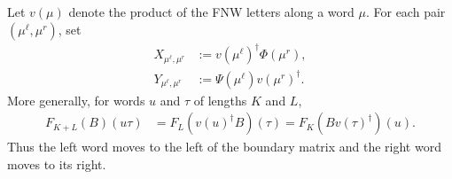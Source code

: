 \begin{definition}
    \label{def:fnw_middle_boundary_matrices}
    \leanok
    Let $v(\mu)$ denote the product of the FNW letters along a word $\mu$.
    For each pair $(\mu^\ell,\mu^r)$, set
    \begin{align}
        X_{\mu^\ell,\mu^r}
         & :=v(\mu^\ell)^\dagger\Phi(\mu^r),
        \label{eq:fnw_left_middle_boundary}  \\
        Y_{\mu^\ell,\mu^r}
         & :=\Psi(\mu^\ell)v(\mu^r)^\dagger.
        \label{eq:fnw_right_middle_boundary}
    \end{align}
    More generally, for words $u$ and $\tau$ of lengths $K$ and $L$,
    \begin{align}
        F_{K+L}(B)(u\tau)
         & =F_L(v(u)^\dagger B)(\tau)
        =F_K(Bv(\tau)^\dagger)(u).
        \label{eq:fnw_boundary_word_splitting}
    \end{align}
    Thus the left word moves to the left of the boundary matrix and the right
    word moves to its right.
\end{definition}

